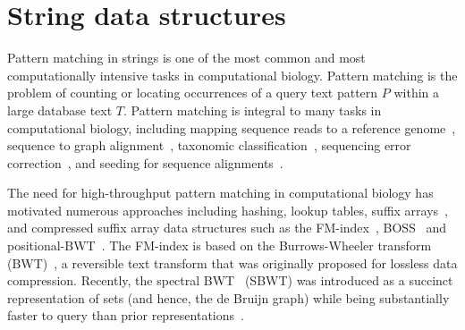 \section{String data structures}

%
Pattern matching in strings is one of the most common and most computationally intensive tasks in computational biology.
%
Pattern matching is the problem of counting or locating occurrences of a query text pattern $P$ within a large database text $T$. Pattern matching is integral to many tasks in computational biology, including mapping sequence reads to a reference genome~\cite{li2009fast,langmead2009ultrafast}, sequence to graph alignment~\cite{Jain2020}, taxonomic classification~\cite{menzel2016fast,kim2016centrifuge}, sequencing error correction~\cite{huang2017efficient}, and seeding for sequence alignments~\cite{buchfink2015fast,altschul1990basic,steinegger2017mmseqs2}.

The need for high-throughput pattern matching in computational biology has motivated numerous approaches including hashing, lookup tables, suffix arrays~\cite{manber1993suffix}, and compressed suffix array data structures such as the FM-index~\cite{ferragina2000opportunistic}, BOSS~\cite{Muggli2019} and positional-BWT~\cite{Durbin2014}.
The FM-index is based on the Burrows-Wheeler transform (BWT)~\cite{burrows1994block}, a reversible text transform that was originally proposed for lossless data compression.   Recently, the spectral BWT~\cite{alanko2023small} (SBWT) was introduced as a succinct representation of \kmer sets (and hence, the de Bruijn graph) while being substantially faster to query than prior representations~\cite{Muggli2019}.



